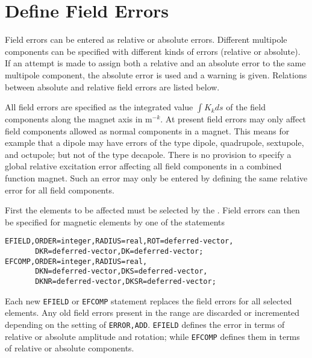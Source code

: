 \section{Define Field Errors}
\label{sec:errorfield}

Field errors can be entered as relative or absolute errors.
Different multipole components can be specified with
different kinds of errors (relative or absolute).
If an attempt is made to assign both a relative
and an absolute error to the same multipole component,
the absolute error is used and a warning is given.
Relations between absolute and relative field errors are listed below.

All field errors are specified as the integrated value $\int K_k ds$ of the 
field components along the magnet axis in $\mathrm{m}^{-k}$.
At present field errors may only affect field components
allowed as normal components in a magnet.
This means for example that a dipole may have errors of the type dipole,
quadrupole, sextupole, and octupole; but not of the type decapole.
There is no provision to specify a global relative
excitation error affecting all field components in a combined function
magnet.
Such an error may only be entered by defining the same relative error
for all field components.

First the elements to be affected must be selected by the 
.
Field errors can then be specified for magnetic elements
by one of the statements
\begin{verbatim}
EFIELD,ORDER=integer,RADIUS=real,ROT=deferred-vector,
       DKR=deferred-vector,DK=deferred-vector;
EFCOMP,ORDER=integer,RADIUS=real,
       DKN=deferred-vector,DKS=deferred-vector,
       DKNR=deferred-vector,DKSR=deferred-vector;
\end{verbatim}
Each new \texttt{EFIELD} or \texttt{EFCOMP} statement
replaces the field errors for all selected elements.
Any old field errors present in the range are discarded
or incremented depending on the setting of \texttt{ERROR,ADD}.
\texttt{EFIELD} defines the error in terms 
of relative or absolute amplitude and rotation;
while \texttt{EFCOMP} defines them in terms 
of relative or absolute components.

